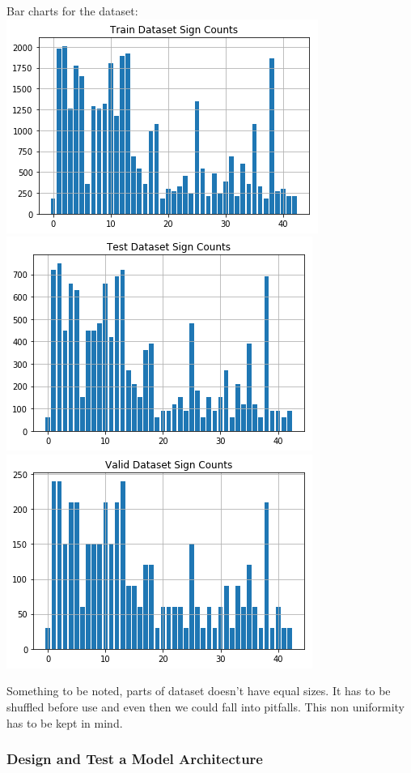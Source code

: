 \documentclass[11pt]{article}
\makeatletter
\def\maxwidth{\ifdim\Gin@nat@width>\linewidth\linewidth
    \else\Gin@nat@width\fi}
\let\Oldincludegraphics\includegraphics
\renewcommand{\includegraphics}[1]{\Oldincludegraphics[width=.8\maxwidth]{#1}}
\makeatother
\begin{document}
Bar charts for the dataset:
\includegraphics{exploratory_visualization1.png}
\includegraphics{exploratory_visualization2.png}
\includegraphics{exploratory_visualization3.png}

Something to be noted, parts of dataset doesn't have equal sizes. It has
to be shuffled before use and even then we could fall into pitfalls.
This non uniformity has to be kept in mind.

\hypertarget{design-and-test-a-model-architecture}{%
\subsubsection{Design and Test a Model
Architecture}\label{design-and-test-a-model-architecture}}
\end{document}
